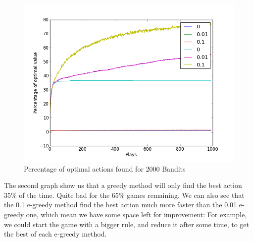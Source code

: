 \documentclass[a4paper, twocolumn, 11pt, draft]{article}
\begin{document}
\begin{figure}
    \centering
    \includegraphics{optimal_action.png}
    \caption{Percentage of optimal actions found for 2000 Bandits}
\end{figure}

The second graph show us that a greedy method will only find the best action
35\% of the time. Quite bad for the 65\% games remaining. We can also see that
the 0.1 e-greedy method find the best action much more faster than the
0.01 e-greedy one, which mean we have some space left for improvement:
For example, we could start the game with a bigger rule, and reduce it after
some time, to get the best of each e-greedy method.
\end{document}

